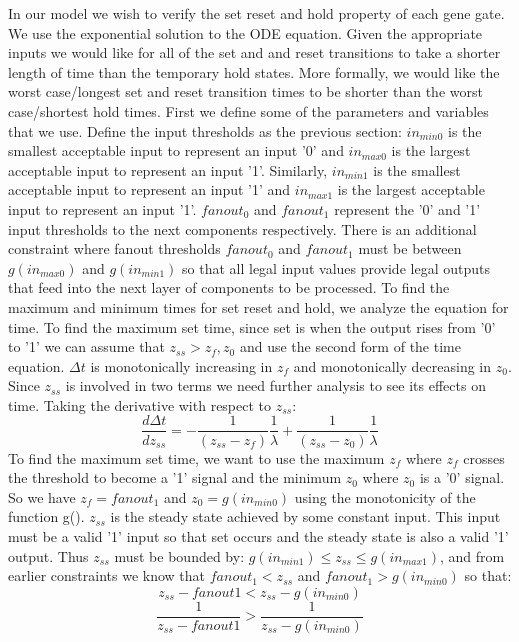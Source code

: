 \documentclass{article}
\begin{document}
\newline 
In our model we wish to verify the set reset and hold property of each gene gate.  We use the exponential solution to the ODE equation.  Given the appropriate inputs we would like for all of the set and and reset transitions to take a shorter length of time than the temporary hold states.  More formally, we would like the worst case/longest set and reset transition times to be shorter than the worst case/shortest hold times.  First we define some of the parameters and variables that we use.  Define the input thresholds as the previous section:  $in_{min0}$ is the smallest acceptable input to represent an input '0' and $in_{max0}$ is the largest acceptable input to represent an input '1'.  Similarly, $in_{min1}$ is the smallest acceptable input to represent an input '1' and $in_{max1}$ is the largest acceptable input to represent an input '1'.  $fanout_0$ and $fanout_1$ represent the '0' and '1' input thresholds to the next components respectively.  There is an additional constraint where fanout thresholds $fanout_0$ and $fanout_1$ must be between $g(in_{max0})$ and $g(in_{min1})$ so that all legal input values provide legal outputs that feed into the next layer of components to be processed.
\newline
To find the maximum and minimum times for set reset and hold, we analyze the equation for time.  To find the maximum set time, since set is when the output rises from '0' to '1' we can assume that $z_{ss}>z_f, z_0$ and use the second form of the time equation. $\Delta t$ is monotonically increasing in $z_f$ and monotonically decreasing in $z_0$.  Since $z_{ss}$ is involved in two terms we need further analysis to see its effects on time.  Taking the derivative with respect to $z_{ss}$:
\[\frac{d\Delta t}{dz_{ss}}=- \frac{1}{(z_{ss}-z_f)}\frac{1}{\lambda}+ \frac{1}{(z_{ss}-z_0)}\frac{1}{\lambda}
\]
To find the maximum set time, we want to use the maximum $z_f$ where $z_f$ crosses the threshold to become a '1' signal and the minimum $z_0$ where $z_0$ is a '0' signal.  So we have $z_f=fanout_1$ and $z_0=g(in_{min0})$ using the monotonicity of the function g().  $z_{ss}$ is the steady state achieved by some constant input.  This input must be a valid '1' input so that set occurs and the steady state is also a valid '1' output.  Thus $z_{ss}$ must be bounded by: $g(in_{min1})\leq z_{ss}\leq g(in_{max1})$, and from earlier constraints we know that $fanout_1<z_{ss}$ and $fanout_1>g(in_{min0})$ so that:
\[z_{ss}-fanout1< z_{ss}-g(in_{min0})
\]
\[\frac{1}{z_{ss}-fanout1}>\frac{1}{z_{ss}-g(in_{min0})}
\]
\end{document}
